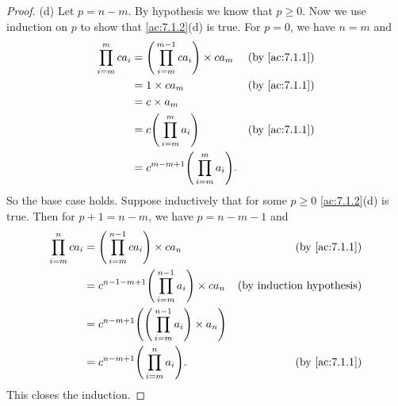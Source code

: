 \begin{proof}{(d)}
  Let \(p = n - m\).
  By hypothesis we know that \(p \geq 0\).
  Now we use induction on \(p\) to show that \cref{ac:7.1.2}(d) is true.
  For \(p = 0\), we have \(n = m\) and
  \begin{align*}
    \prod_{i = m}^m ca_i & = \Bigg(\prod_{i = m}^{m - 1} ca_i\Bigg) \times ca_m & \text{(by \cref{ac:7.1.1})} \\
                         & = 1 \times ca_m                                      & \text{(by \cref{ac:7.1.1})} \\
                         & = c \times a_m                                                                     \\
                         & = c \Bigg(\prod_{i = m}^m a_i\Bigg)                  & \text{(by \cref{ac:7.1.1})} \\
                         & = c^{m - m + 1} \Bigg(\prod_{i = m}^m a_i\Bigg).
  \end{align*}
  So the base case holds.
  Suppose inductively that for some \(p \geq 0\) \cref{ac:7.1.2}(d) is true.
  Then for \(p + 1 = n - m\), we have \(p = n - m - 1\) and
  \begin{align*}
    \prod_{i = m}^n ca_i & = \Bigg(\prod_{i = m}^{n - 1} ca_i\Bigg) \times ca_n                         & \text{(by \cref{ac:7.1.1})}      \\
                         & = c^{n - 1 - m + 1} \Bigg(\prod_{i = m}^{n - 1} a_i\Bigg) \times ca_n        & \text{(by induction hypothesis)} \\
                         & = c^{n - m + 1} \Bigg(\Bigg(\prod_{i = m}^{n - 1} a_i\Bigg) \times a_n\Bigg)                                    \\
                         & = c^{n - m + 1} \Bigg(\prod_{i = m}^n a_i\Bigg).                             & \text{(by \cref{ac:7.1.1})}
  \end{align*}
  This closes the induction.
\end{proof}

